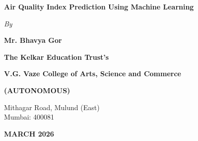 \documentclass[12pt,a4paper]{report}
\begin{document}
\pagestyle{empty}

\begin{center}

\vspace*{1.5cm}

{\large \textbf{Air Quality Index Prediction Using Machine Learning}}

\vspace{1.5cm}

{\textit{By}}

\vspace{0.5cm}

{\large \textbf{Mr. Bhavya Gor}}

\vspace{2.5cm}

{\large \textbf{The Kelkar Education Trust's}}

\vspace{0.3cm}

{\large \textbf{V.G. Vaze College of Arts, Science and Commerce}}

\vspace{0.3cm}

{\large \textbf{(AUTONOMOUS)}}

\vspace{0.5cm}

{Mithagar Road, Mulund (East)\\
Mumbai: 400081}

\vspace{2.5cm}

{\large \textbf{MARCH 2026}}

\end{center}

\clearpage
\thispagestyle{empty}
\mbox{}

\clearpage
\thispagestyle{empty}

\vspace*{1cm}
\end{document}
